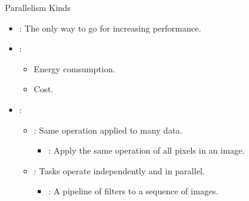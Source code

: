 \begin{frame}[t]{Parallelism Kinds}
\begin{itemize}
  \item {}: The only way to go for increasing performance.

  \item {}:
    \begin{itemize}
      \item Energy comsumption.
      \item Cost.
    \end{itemize}

  \item {}:
    \begin{itemize}
      \item {}: Same operation applied to many data.
        \begin{itemize}
          \item {}: Apply the same operation of all pixels in an image.
        \end{itemize}

      \item {}: Tasks operate independently and in parallel.
        \begin{itemize}
          \item {}: A pipeline of filters to a sequence of images.
        \end{itemize}
    \end{itemize}
\end{itemize}
\end{frame}

